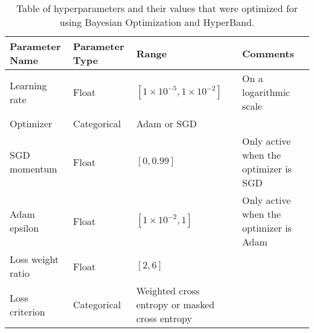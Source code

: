 \begin{table}[]
\begin{tabular}{@{}llp{3.9cm}p{3cm}@{}}
\toprule
Parameter Name    & Parameter Type & Range                                            & Comments                               \\ \midrule
Learning rate     & Float          & $\left[1 \times 10^{-5}, 1 \times 10^{-2}\right]$& On a logarithmic scale                \\
Optimizer         & Categorical    & Adam or SGD                                      &                                      \\
SGD momentum      & Float          & $\left[0, 0.99\right]$                           & Only active when the optimizer is SGD\\
Adam epsilon      & Float          & $\left[1 \times 10^{-2}, 1\right]$               & Only active when the optimizer is Adam\\
Loss weight ratio & Float          & $\left[2,6\right]$                               &                                       \\
Loss criterion    & Categorical    & Weighted cross entropy or masked cross entropy   &                                      \\ \bottomrule
\end{tabular}
\caption[Hyperparameter Details]{Table of hyperparameters and their values that were optimized for using Bayesian Optimization and HyperBand.}
\label{tab:hyperparameters}
\end{table}